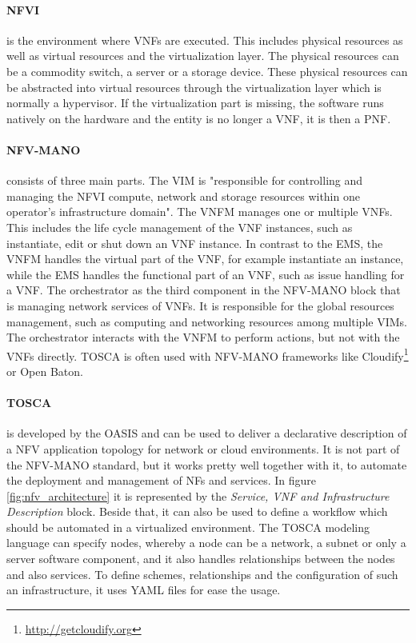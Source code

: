 \paragraph{\ac{NFVI}} is the environment where \acp{VNF} are executed.
This includes physical resources as well as virtual resources and the virtualization layer.
The physical resources can be a commodity switch, a server or a storage device.
These physical resources can be abstracted into virtual resources through the virtualization layer which is normally a hypervisor.
If the virtualization part is missing, the software runs natively on the hardware and the entity is no longer a \ac{VNF}, it is then a \ac{PNF}.\autocite[cf.]{Kahn:2015}

\paragraph{\ac{NFV-MANO}} consists of three main parts.
The \ac{VIM} is "responsible for controlling and managing the NFVI compute, network and storage resources within one operator’s infrastructure domain"\autocite{Kahn:2015}.
The \ac{VNFM} manages one or multiple \acp{VNF}.
This includes the life cycle management of the \ac{VNF} instances, such as instantiate, edit or shut down an \ac{VNF} instance.\autocite[cf.]{Tosca:NFV}
In contrast to the \ac{EMS}, the \ac{VNFM} handles the virtual part of the \ac{VNF}, for example instantiate an instance, while the \ac{EMS} handles the functional part of an \ac{VNF}, such as issue handling for a \ac{VNF}.
The orchestrator as the third component in the \ac{NFV-MANO} block that is managing network services of \acp{VNF}.
It is responsible for the global resources management, such as computing and networking resources among multiple \acp{VIM}.\autocite[cf.]{Kahn:2015}
The orchestrator interacts with the \ac{VNFM} to perform actions, but not with the \acp{VNF} directly.\autocite[cf.]{Kahn:2015}
\ac{TOSCA} is often used with \ac{NFV-MANO} frameworks like Cloudify\footnote{\url{http://getcloudify.org}} or Open Baton.\autocite[cf.]{Tosca:NFV}

\paragraph{\ac{TOSCA}} is developed by the \ac{OASIS} and can be used to deliver a declarative description of a \ac{NFV} application topology for network or cloud environments.\autocite[cf.]{Tosca:NFV}
It is not part of the \ac{NFV-MANO} standard, but it works pretty well together with it, to automate the deployment and management of \acp{NF} and services.
In figure \ref{fig:nfv_architecture} it is represented by the \textit{Service, VNF and Infrastructure Description} block.
Beside that, it can also be used to define a workflow which should be automated in a virtualized environment.\autocite[cf.]{Tosca:NFV}
The \ac{TOSCA} modeling language can specify nodes, whereby a node can be a network, a subnet or only a server software component, and it also handles relationships between the nodes and also services.\autocite[cf.]{Tosca:NFV}
To define schemes, relationships and the configuration of such an infrastructure, it uses \ac{YAML} files for ease the usage.\autocite[cf.]{Tosca:NFV}


